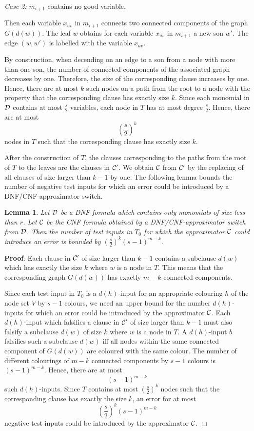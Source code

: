 \documentclass[11pt]{article}
\newtheorem{lem}{Lemma}
\begin{document}
\smallskip
\noindent
{\em Case 2:} $m_{i+1}$ contains no good variable.

\smallskip
Then each variable $x_{uv}$ in $m_{i+1}$ connects two connected components of the graph $G(d(w))$. The leaf $w$
obtains for each variable $x_{uv}$ in $m_{i+1}$ a new son $w'$. The edge $(w,w')$ is labelled with the variable
$x_{uv}$.

\smallskip
By construction, when decending on an edge to a son from a node with more than one son, the number of connected
components of the associated graph decreases by one. Therefore, the size of the corresponding clause increases by
one. Hence, there are at most $k$ such nodes on a path from the root to a node with the property that the
corresponding clause has exactly size $k$. Since each monomial in ${\cal D}$ contains at most $\frac{s}{2}$
variables, each node in $T$ has at most degree $\frac{s}{2}$. Hence, there are at most
$$
\left(\frac{s}{2}\right)^k
$$
nodes in $T$ such that the corresponding clause has exactly size $k$.

After the construction of $T$, the clauses corresponding to the paths from the root of $T$ to the leaves are the
clauses in ${\cal C}'$. We obtain ${\cal C}$ from ${\cal C}'$ by the replacing of all clauses of size larger than
$k-1$ by one.
The following lemma bounds the number of negative test inputs for which an error could be introduced by a
DNF/CNF-approximator switch.

\begin{lem} \label{lem4.2}
  Let ${\cal D}$ be a DNF formula which contains only monomials of size less than $r$. Let ${\cal C}$ be the CNF
  formula obtained by a DNF/CNF-approximator switch from ${\cal D}$. Then the number of test inputs in $T_0$
  for which the approximator ${\cal C}$ could introduce an error is bounded by
  $\left(\frac{s}{2}\right)^k(s-1)^{m-k}$.
\end{lem}
{\bf Proof}:
Each clause in ${\cal C}'$ of size larger than $k-1$ contains a subclause $d(w)$ which has exactly the size $k$
where $w$ is a node in $T$. This means that the corresponding graph $G(d(w))$ has exactly $m-k$ connected components.

Since each test input in $T_0$ is a $d(h)$-input for an appropriate colouring $h$ of the node set $V$ by $s-1$
colours, we need an upper bound for the number $d(h)$-inputs for which an error could be introduced by the
approximator ${\cal C}$. Each $d(h)$-input which falsifies a clause in ${\cal C}'$ of size larger than $k-1$
must also falsify a subclause $d(w)$ of size $k$ where $w$ is a node in $T$. A $d(h)$-input $b$ falsifies such a
subclause $d(w)$ iff all nodes within the same connected component of $G(d(w))$ are coloured with the same colour.
The number of different colourings of $m-k$ connected components by $s-1$ colours is $(s-1)^{m-k}$. Hence, there
are at most
$$
(s-1)^{m-k}
$$
such $d(h)$-inputs. Since $T$ contains at most $\left(\frac{s}{2}\right)^k$ nodes such that the corresponding
clause has exactly the size $k$, an error for at most
$$
\left(\frac{s}{2}\right)^k(s-1)^{m-k}
$$
negative test inputs could be introduced by the approximator ${\cal C}$.
$\Box$
\end{document}
